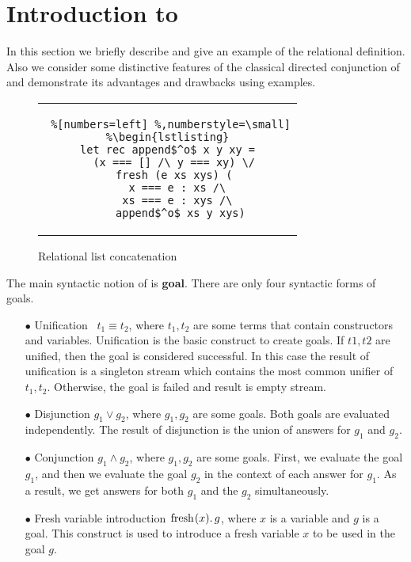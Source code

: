 \section{Introduction to \mk}
\label{sec:directed}

In this section we briefly describe \mk and give an example of the relational definition. Also we consider some distinctive features of the classical directed
conjunction of \mk and demonstrate its advantages and drawbacks using examples. 

\begin{figure}[b]
\centering
\begin{tabular}{c}
\begin{lstlisting} %[numbers=left] %,numberstyle=\small]
%\begin{lstlisting}
let rec append$^o$ x y xy =
  (x === [] /\ y === xy) \/
  fresh (e xs xys) (
    x === e : xs /\ 
    xs === e : xys /\ 
    append$^o$ xs y xys)
\end{lstlisting}
\end{tabular}
\caption{Relational list concatenation}
\label{fair:lst-appendo}
\vspace{-5mm}
\end{figure}

The main syntactic notion of \mk is \textbf{goal}. There are only four syntactic forms of goals.

\begin{itemize}
\item[$\bullet$] Unification~\cite{fair:unify} $t_1 \equiv t_2$, where $t_1, t_2$ are some terms that contain constructors and variables. Unification is the basic
  construct to create goals. If $t1, t2$ are unified, then the goal is considered successful. In this case the result of unification is a singleton stream which
  contains the most common unifier of $t_1, t_2$. Otherwise, the goal is failed and result is empty stream.
\item[$\bullet$] Disjunction $g_1 \lor g_2$, where $g_1, g_2$ are some goals. Both goals are evaluated independently. The result of disjunction is the union of answers for $g_1$ and $g_2$.
\item[$\bullet$] Conjunction $g_1 \land g_2$, where $g_1, g_2$ are some goals. First, we evaluate the goal $g_1$, and then we evaluate the goal $g_2$ in the context of each
  answer for $g_1$. As a result, we get answers for both $g_1$ and the $g_2$ simultaneously.
\item[$\bullet$] Fresh variable introduction \!$\lstinline{fresh} (x). \, g$, where $x$ is a variable and $g$ is a goal. This construct is used to introduce a fresh variable $x$
  to be used in the goal $g$.
\end{itemize}

